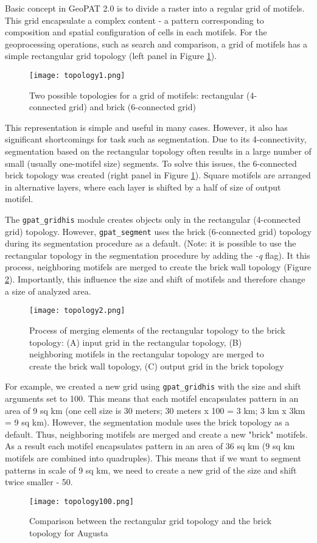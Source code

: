 
Basic concept in GeoPAT 2.0 is to divide a raster into a regular grid of motifels.
This grid encapsulate a complex content - a pattern corresponding to composition and spatial configuration of cells in each motifels.
For the geoprocessing operations, such as search and comparison, a grid of motifels has a simple rectangular grid topology (left panel in Figure \ref{FIG:TOPO1}). 

\begin{figure}[H]
	\centering
	\texttt{[image: topology1.png]}
	\caption{Two possible topologies for a grid of motifels: rectangular (4-connected grid) and brick (6-connected grid)}
	\label{FIG:TOPO1}
\end{figure}

This representation is simple and useful in many cases.
However, it also has significant shortcomings for task such as segmentation.
Due to its 4-connectivity, segmentation based on the rectangular topology often results in a large number of small (usually one-motifel size) segments.
To solve this issues, the 6-connected brick topology was created (right panel in Figure \ref{FIG:TOPO1}).
Square motifels are arranged in alternative layers, where each layer is shifted by a half of size of output motifel.

The {\tt gpat\_gridhis} module creates objects only in the rectangular (4-connected grid) topology. 
However, {\tt gpat\_segment} uses the brick (6-connected grid) topology during its segmentation procedure as a default.
(Note: it is possible to use the rectangular topology in the segmentation procedure by adding the {\it -q} flag).
It this process, neighboring motifels are merged to create the brick wall topology (Figure \ref{FIG:TOPO2}).
Importantly, this influence the size and shift of motifels and therefore change a size of analyzed area.

\begin{figure}[H]
	\centering
	\texttt{[image: topology2.png]}
	\caption{Process of merging elements of the rectangular topology to the brick topology: (A) input grid in the rectangular topology, (B) neighboring motifels in the rectangular topology are merged to create the brick wall topology, (C) output grid in the brick topology}
	\label{FIG:TOPO2}
\end{figure}

For example, we created a new grid using {\tt gpat\_gridhis} with the size and shift arguments set to 100.
This means that each motifel encapsulates pattern in an area of 9 sq km (one cell size is 30 meters; 30 meters x 100 = 3 km; 3 km x 3km = 9 sq km).
However, the segmentation module uses the brick topology as a default.
Thus, neighboring motifels are merged and create a new "brick" motifels.
As a result each motifel encapsulates pattern in an area of 36 sq km (9 sq km motifels are combined into quadruples).
This means that if we want to segment patterns in scale of 9 sq km, we need to create a new grid of the size and shift twice smaller - 50.

\begin{figure}[H]
	\centering
	\texttt{[image: topology100.png]}
	\caption{Comparison between the rectangular grid topology and the brick topology for Augusta}
	\label{FIG:TOPO3}
\end{figure}

